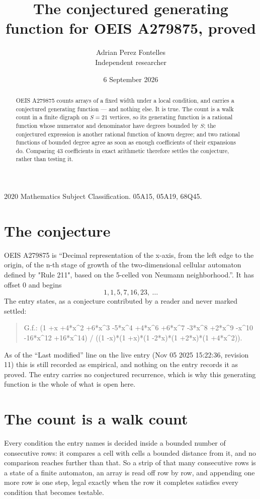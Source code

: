 \documentclass[11pt,a4paper]{article}
\title{The conjectured generating function for OEIS A279875, proved}
\author{Adrian Perez Fontelles\\ \small Independent researcher}
\date{6 September 2026}
\theoremstyle{plain}
\theoremstyle{definition}
\begin{document}
\maketitle

\begin{abstract}
OEIS A279875 counts arrays of a fixed width under a local condition, and carries a conjectured
generating function --- and nothing else. It is true. The count is a walk count in a finite
digraph on $S=21$ vertices, so its generating function is a rational function whose numerator
and denominator have degrees bounded by $S$; the conjectured expression is another rational
function of known degree; and two rational functions of bounded degree agree as soon as enough
coefficients of their expansions do. Comparing $43$ coefficients in exact arithmetic
therefore settles the conjecture, rather than testing it.
\end{abstract}

\noindent\small 2020 Mathematics Subject Classification. 05A15, 05A19, 68Q45.\normalsize

\section{The conjecture}

OEIS A279875 is ``Decimal representation of the x-axis, from the left edge to the origin, of the n-th stage of growth of the two-dimensional cellular automaton defined by "Rule 211", based on the 5-celled von Neumann neighborhood.''. It has offset $0$ and begins
\[
1, 1, 5, 7, 16, 23,\ \dots
\]
The entry states, as a conjecture contributed by a reader and never marked settled:
\begin{quote}
G.f.: (1 +x +4*x\^{}2 +6*x\^{}3 -5*x\^{}4 +4*x\^{}6 +6*x\^{}7 -3*x\^{}8 +2*x\^{}9 -x\^{}10 -16*x\^{}12 +16*x\^{}14) / ((1 -x)*(1 +x)*(1 -2*x)*(1 +2*x)*(1 +4*x\^{}2)).
\end{quote}
As of the ``Last modified'' line on the live entry (Nov 05 2025 15:22:36, revision 11) this is still
recorded as empirical, and nothing on the entry records it as proved. The entry carries no
conjectured recurrence, which is why this generating function is the whole of what is open
here.

\section{The count is a walk count}

Every condition the entry names is decided inside a bounded number of consecutive rows: it
compares a cell with cells a bounded distance from it, and no comparison reaches further than
that. So a strip of that many consecutive rows is a state of a finite automaton, an array is
read off row by row, and appending one more row is one step, legal exactly when the row it
completes satisfies every condition that becomes testable.
\end{document}
